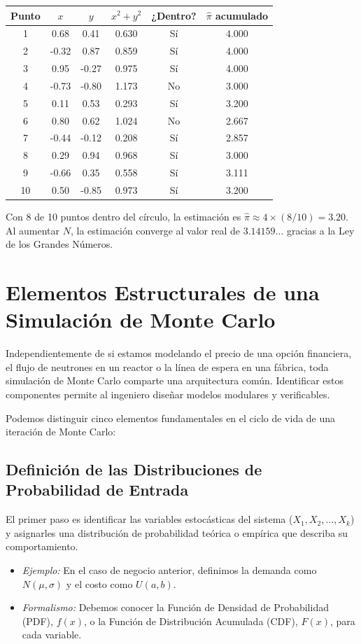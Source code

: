 \documentclass[11pt, letterpaper]{article}
\begin{document}
\begin{center}
\small
\begin{tabular}{cccccc}
\toprule
\textbf{Punto} & $x$ & $y$ & $x^2+y^2$ & \textbf{¿Dentro?} & $\hat{\pi}$ acumulado \\
\midrule
1  &  0.68 &  0.41 & 0.630 & Sí  & 4.000 \\
2  & -0.32 &  0.87 & 0.859 & Sí  & 4.000 \\
3  &  0.95 & -0.27 & 0.975 & Sí  & 4.000 \\
4  & -0.73 & -0.80 & 1.173 & No  & 3.000 \\
5  &  0.11 &  0.53 & 0.293 & Sí  & 3.200 \\
6  &  0.80 &  0.62 & 1.024 & No  & 2.667 \\
7  & -0.44 & -0.12 & 0.208 & Sí  & 2.857 \\
8  &  0.29 &  0.94 & 0.968 & Sí  & 3.000 \\
9  & -0.66 &  0.35 & 0.558 & Sí  & 3.111 \\
10 &  0.50 & -0.85 & 0.973 & Sí  & 3.200 \\
\bottomrule
\end{tabular}
\end{center}
Con 8 de 10 puntos dentro del círculo, la estimación es $\hat{\pi} \approx 4 \times (8/10) = 3.20$. Al aumentar $N$, la estimación converge al valor real de $3.14159\dots$ gracias a la Ley de los Grandes Números.

\section{Elementos Estructurales de una Simulación de Monte Carlo}

Independientemente de si estamos modelando el precio de una opción financiera, el flujo de neutrones en un reactor o la línea de espera en una fábrica, toda simulación de Monte Carlo comparte una arquitectura común. Identificar estos componentes permite al ingeniero diseñar modelos modulares y verificables.

Podemos distinguir cinco elementos fundamentales en el ciclo de vida de una iteración de Monte Carlo:

\subsection{Definición de las Distribuciones de Probabilidad de Entrada}
El primer paso es identificar las variables estocásticas del sistema ($X_1, X_2, \dots, X_k$) y asignarles una distribución de probabilidad teórica o empírica que describa su comportamiento.
\begin{itemize}
    \item \textit{Ejemplo:} En el caso de negocio anterior, definimos la demanda como $N(\mu, \sigma)$ y el costo como $U(a, b)$.
    \item \textit{Formalismo:} Debemos conocer la Función de Densidad de Probabilidad (PDF), $f(x)$, o la Función de Distribución Acumulada (CDF), $F(x)$, para cada variable.
\end{itemize}
\end{document}
